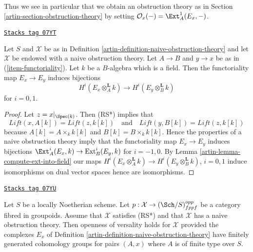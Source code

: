 Thus we see in particular that we obtain an obstruction theory
as in Section \ref{artin-section-obstruction-theory} by setting
$\mathcal{O}_x( - ) = \Ext^1_A(E_x, -)$.

\begin{lemma}
\label{artin-lemma-naive-obstruction-theory-qis}
\href{https://stacks.math.columbia.edu/tag/07YT}{\texttt{Stacks tag 07YT}}

Let $S$ and $\mathcal{X}$ be as in
Definition \ref{artin-definition-naive-obstruction-theory}
and let $\mathcal{X}$ be endowed with a naive obstruction theory.
Let $A \to B$ and $y \to x$ be as in (\ref{item-functoriality}).
Let $k$ be a $B$-algebra which is a field. Then the functoriality
map $E_x \to E_y$ induces bijections
$$
H^i(E_x \otimes_A^{\mathbf{L}} k) \to H^i(E_y \otimes_B^{\mathbf{L}} k)
$$
for $i = 0, 1$.
\end{lemma}

\begin{proof}

Let $z = x|_{\Spec(k)}$. Then (RS*) implies that
$$
\textit{Lift}(x, A[k]) = \textit{Lift}(z, k[k])
\quad\text{and}\quad
\textit{Lift}(y, B[k]) = \textit{Lift}(z, k[k])
$$
because $A[k] = A \times_k k[k]$ and $B[k] = B \times_k k[k]$.
Hence the properties of a naive obstruction theory imply that the
functoriality map $E_x \to E_y$ induces bijections
$\Ext^i_A(E_x, k) \to \text{Ext}^i_B(E_y, k)$
for $i = -1, 0$. By Lemma \ref{artin-lemma-compute-ext-into-field} our maps
$H^i(E_x \otimes_A^{\mathbf{L}} k) \to H^i(E_y \otimes_B^{\mathbf{L}} k)$,
$i = 0, 1$ induce isomorphisms on dual vector spaces hence are isomorphisms.
\end{proof}

\begin{lemma}
\label{artin-lemma-naive-obstruction-theory-gives-openness}
\href{https://stacks.math.columbia.edu/tag/07YU}{\texttt{Stacks tag 07YU}}

Let $S$ be a locally Noetherian scheme. Let
$p : \mathcal{X} \to (\Sch/S)_{fppf}^{opp}$ be a category fibred in groupoids.
Assume that $\mathcal{X}$ satisfies (RS*)
and that $\mathcal{X}$ has a naive obstruction theory.
Then openness of versality holds for $\mathcal{X}$ provided the
complexes $E_x$ of Definition \ref{artin-definition-naive-obstruction-theory}
have finitely generated cohomology groups for pairs $(A, x)$ where
$A$ is of finite type over $S$.
\end{lemma}

